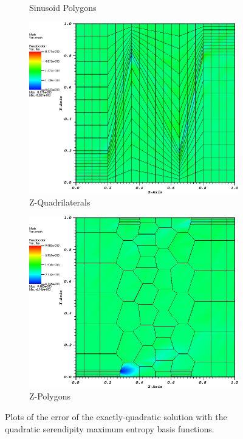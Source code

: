 \begin{figure}
{\begin{subfigure}[b]{0.465\textwidth}
		\caption{Sinusoid Polygons}
	\end{subfigure}
}
\vspace{3mm}
{
	\begin{subfigure}[b]{0.465\textwidth}
		\centering
		\label{subfig::z_quad_me_k2_lin_sol}
		\includegraphics[width=\textwidth]{figures/sec_BF/quad_err_zquad_ME2.png}
		\caption{Z-Quadrilaterals}
	\end{subfigure}
	\hfill
	\begin{subfigure}[b]{0.465\textwidth}
		\centering
		\label{subfig::z_poly_me_k2_lin_sol}
		\includegraphics[width=\textwidth]{figures/sec_BF/quad_err_zpoly_ME2.png}
		\caption{Z-Polygons}
	\end{subfigure}
}
\caption{Plots of the error of the exactly-quadratic solution with the quadratic serendipity maximum entropy basis functions.}
\label{fig::BF_Results_quad_err_ME2}
\end{figure}

